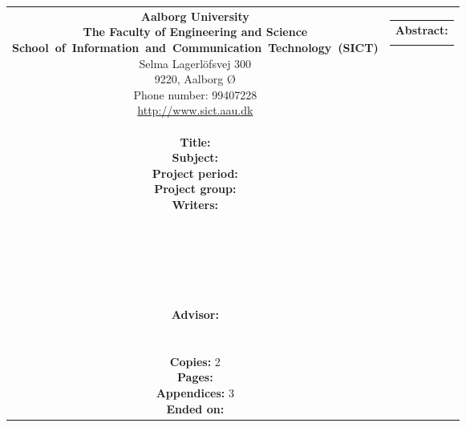 \thispagestyle{empty}
{\samepage 
\begin{tabular}{cc}
	\parbox{7cm}{
	{\sf\noindent
	\textbf{Aalborg University}\\
	\textbf{The Faculty of Engineering and Science}\\
	\mbox{\textbf{School of Information and Communication Technology (SICT)}}\\
	Selma Lagerlöfsvej 300\\
	9220, Aalborg Ø\\
	Phone number: 99407228\\
	\url{http://www.sict.aau.dk}} \\\\
	{\bf Title:} \TITLE\\
	{\bf Subject:} \SUBJECT\\
	{\bf Project period:} \PERIOD\\
	{\bf Project group:} \GROUPNUMBER\\
	{\bf Writers:}\\[0.7cm]
      		\underline{\phantom{\TPNAMESPACE}}\\
      		\NAMEONE \\[0.7cm]
      		\underline{\phantom{\TPNAMESPACE}}\\
      		\NAMETWO \\[0.7cm]
      		\underline{\phantom{\TPNAMESPACE}}\\
      		\NAMETHREE \\[0.7cm]
	{\bf Advisor:} \\
	\SUPERVISOR \\\\
	{\bf Copies:} 2\\
	{\bf Pages:} \pageref{LastPage}\\
	{\bf Appendices:} 3\\
	{\bf Ended on:} \ENDDATE
	\vfill} &
	\parbox{7cm}{
	\vspace{.15cm}
	\hfill 
	\begin{tabular}{l}
		{\bf Abstract:}\bigskip \\
		\fbox{
		\parbox{6cm}{\bigskip
		{\vfill{\small 
		\bigskip}}
		}\hspace{0.2em}}
	\end{tabular}}
\end{tabular}\vfill
{}
}